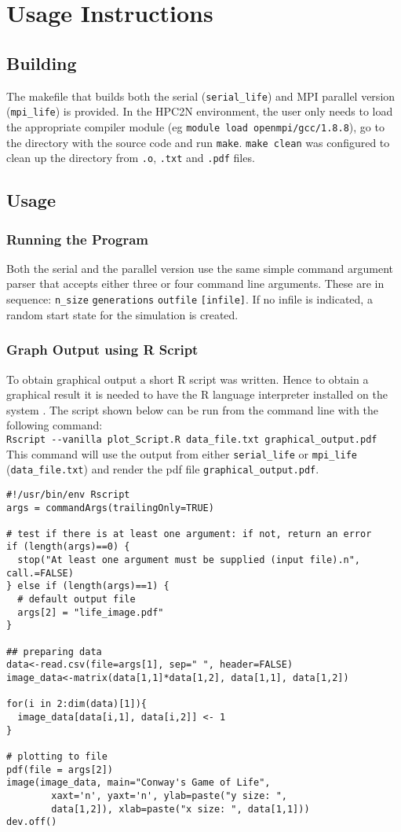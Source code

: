 \documentclass[a4paper,11pt,twoside]{article}
\begin{document}
\section{Usage Instructions}
\subsection{Building}
The makefile that builds both the serial (\verb+serial_life+) and MPI parallel version (\verb+mpi_life+) is provided. In the HPC2N environment, the user only needs to load the appropriate compiler module (eg \verb+module load openmpi/gcc/1.8.8+), go to the directory with the source code and run \verb+make+. \verb+make clean+ was configured to clean up the directory from \verb+.o+, \verb+.txt+ and \verb+.pdf+ files. 

\subsection{Usage}

\subsubsection{Running the Program}
Both the serial and the parallel version use the same simple command argument parser that accepts either three or four command line arguments. These are in sequence: \verb+n_size+ \verb+generations+ \verb+outfile+ \verb+[infile]+. If no infile is indicated, a random start state for the simulation is created.
\subsubsection{Graph Output using R Script}
To obtain graphical output a short R script was written. Hence to obtain a graphical result it is needed to have the R language interpreter installed on the system \cite{rlanguage}. The script shown below can be run from the command line with the following command:\\
\verb+Rscript --vanilla plot_Script.R data_file.txt graphical_output.pdf+\\
This command will use the output from either \verb+serial_life+ or \verb+mpi_life+ (\verb+data_file.txt+) and render the pdf file \verb+graphical_output.pdf+.   
\begin{verbatim}
#!/usr/bin/env Rscript
args = commandArgs(trailingOnly=TRUE)

# test if there is at least one argument: if not, return an error
if (length(args)==0) {
  stop("At least one argument must be supplied (input file).n", call.=FALSE)
} else if (length(args)==1) {
  # default output file
  args[2] = "life_image.pdf"
}

## preparing data
data<-read.csv(file=args[1], sep=" ", header=FALSE)
image_data<-matrix(data[1,1]*data[1,2], data[1,1], data[1,2])

for(i in 2:dim(data)[1]){
  image_data[data[i,1], data[i,2]] <- 1
}

# plotting to file
pdf(file = args[2])
image(image_data, main="Conway's Game of Life", 
        xaxt='n', yaxt='n', ylab=paste("y size: ", 
        data[1,2]), xlab=paste("x size: ", data[1,1]))
dev.off()
\end{verbatim}
\end{document}
